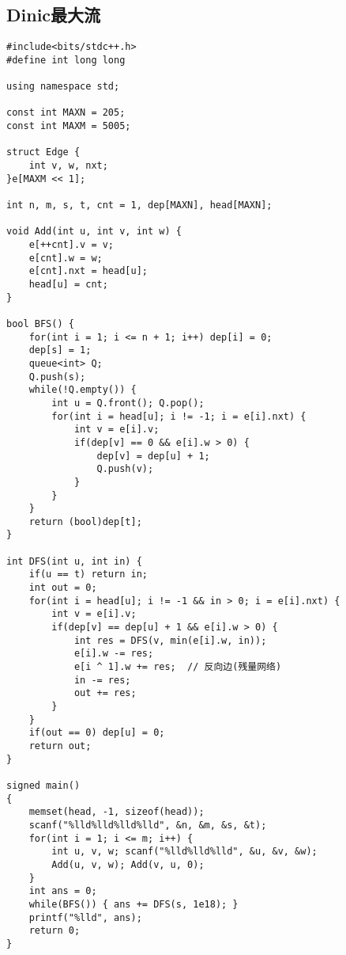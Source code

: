 \subsection{Dinic最大流}
\begin{lstlisting}
#include<bits/stdc++.h>
#define int long long

using namespace std;

const int MAXN = 205;
const int MAXM = 5005;

struct Edge {
	int v, w, nxt;
}e[MAXM << 1];

int n, m, s, t, cnt = 1, dep[MAXN], head[MAXN];

void Add(int u, int v, int w) {
	e[++cnt].v = v;
	e[cnt].w = w;
	e[cnt].nxt = head[u];
	head[u] = cnt;
}

bool BFS() {
	for(int i = 1; i <= n + 1; i++) dep[i] = 0;
	dep[s] = 1;
	queue<int> Q;
	Q.push(s);
	while(!Q.empty()) {
		int u = Q.front(); Q.pop();
		for(int i = head[u]; i != -1; i = e[i].nxt) {
			int v = e[i].v;
			if(dep[v] == 0 && e[i].w > 0) {
				dep[v] = dep[u] + 1;
				Q.push(v);
			}
		}
	}
	return (bool)dep[t];
}

int DFS(int u, int in) {
	if(u == t) return in;
	int out = 0;
	for(int i = head[u]; i != -1 && in > 0; i = e[i].nxt) {
		int v = e[i].v;
		if(dep[v] == dep[u] + 1 && e[i].w > 0) {
			int res = DFS(v, min(e[i].w, in));
			e[i].w -= res;
			e[i ^ 1].w += res;	// 反向边(残量网络)
			in -= res;
			out += res; 
		}
	}
	if(out == 0) dep[u] = 0;
	return out;
}

signed main()
{
	memset(head, -1, sizeof(head));
	scanf("%lld%lld%lld%lld", &n, &m, &s, &t);
	for(int i = 1; i <= m; i++) {
		int u, v, w; scanf("%lld%lld%lld", &u, &v, &w);
		Add(u, v, w); Add(v, u, 0);
	}
	int ans = 0;
	while(BFS()) { ans += DFS(s, 1e18); }
	printf("%lld", ans);
	return 0;
}
\end{lstlisting}


